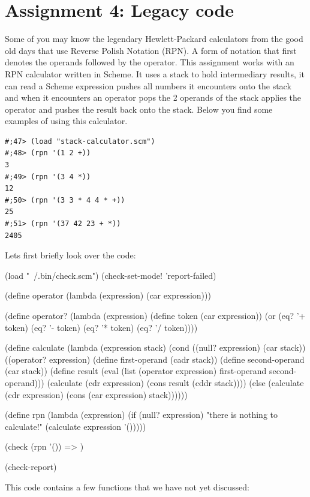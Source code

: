 \documentclass[12pt,a4paper,english,twoside]{article}
\begin{document}
\section{Assignment 4: Legacy code}
Some of you may know the legendary Hewlett-Packard calculators from the good 
old days that use Reverse Polish Notation (RPN). A form of notation that first 
denotes the operands followed by the operator. This assignment works with an
RPN calculator written in Scheme. It uses a stack to hold intermediary 
results, it can read a Scheme expression pushes all numbers it encounters onto 
the stack and when it encounters an operator pops the 2 operands of the stack 
applies the operator and pushes the result back onto the stack. Below you find 
some examples of using this calculator.
\begin{lstlisting}
#;47> (load "stack-calculator.scm")
#;48> (rpn '(1 2 +))
3
#;49> (rpn '(3 4 *))
12
#;50> (rpn '(3 3 * 4 4 * +))
25
#;51> (rpn '(37 42 23 + *))
2405
\end{lstlisting}
\vfill
\pagebreak
Lets first briefly look over the code:
\begin{schemecode}
(load "~/.bin/check.scm")
(check-set-mode! 'report-failed)

(define operator
  (lambda (expression) 
    (car expression)))

(define operator? 
  (lambda (expression)
    (define token (car expression))
    (or (eq? '+ token)
        (eq? '- token)
        (eq? '* token)
        (eq? '/ token))))

(define calculate 
  (lambda (expression stack)
    (cond ((null? expression) (car stack))
          ((operator? expression)
            (define first-operand (cadr stack))
            (define second-operand (car stack))
            (define result (eval (list 
                                   (operator expression) 
                                   first-operand 
                                   second-operand)))
            (calculate 
              (cdr expression) 
              (cons result (cddr stack))))
          (else (calculate 
                  (cdr expression) 
                  (cons (car expression) stack))))))

(define rpn 
  (lambda (expression)
      (if (null? expression)
        "there is nothing to calculate!"
        (calculate expression '()))))

(check (rpn '()) => )

(check-report)
\end{schemecode}
This code contains a few functions that we have not yet discussed:
\end{document}
